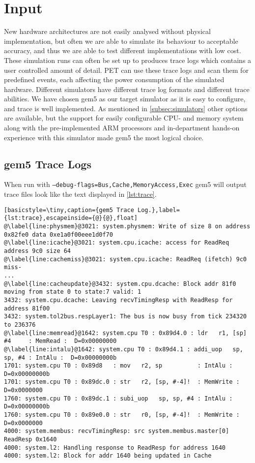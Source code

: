 \section{Input}
New hardware architectures are not easily analysed without physical
implementation, but often we are able to simulate its behaviour to acceptable
accuracy, and thus we are able to test different implementations with low cost.
These simulation runs can often be set up to produces trace logs which contains
a user controlled amount of detail. PET can use these trace logs and scan them
for predefined events, each affecting the power consumption of the simulated
hardware. Different simulators have different trace log formats and different
trace abilities. We have chosen gem5 as our target simulator as it is easy to
configure, and trace is well implemented. As mentioned in
\autoref{subsec:simulators} other options are available, but the support for
easily configurable CPU- and memory system along with the pre-implemented ARM
processors and in-department hands-on experience with this simulator made gem5
the most logical choice.

\subsection{gem5 Trace Logs}
When run with \texttt{--debug-flags=Bus,Cache,MemoryAccess,Exec} gem5 will output trace files look like
the text displayed in \autoref{lst:trace}.

\begin{lstlisting}[basicstyle=\tiny,caption={gem5 Trace Log.},label={lst:trace},escapeinside={@}{@},float]
@\label{line:physmem}@3021: system.physmem: Write of size 8 on address 0x82fe0 data 0xe1a0f00eee1d0f70
@\label{line:icache}@3021: system.cpu.icache: access for ReadReq address 9c0 size 64
@\label{line:cachemiss}@3021: system.cpu.icache: ReadReq (ifetch) 9c0 miss-
...
@\label{line:cacheupdate}@3432: system.cpu.dcache: Block addr 81f0 moving from state 0 to state:7 valid: 1
3432: system.cpu.dcache: Leaving recvTimingResp with ReadResp for address 81f00
3432: system.tol2bus.respLayer1: The bus is now busy from tick 234320 to 236376
@\label{line:memread}@1642: system.cpu T0 : 0x89d4.0 : ldr   r1, [sp] #4     : MemRead :  D=0x00000000
@\label{line:intalu}@1642: system.cpu T0 : 0x89d4.1 : addi_uop   sp, sp, #4 : IntAlu :  D=0x00000000b
1701: system.cpu T0 : 0x89d8   : mov   r2, sp          : IntAlu :  D=0x00000000b
1701: system.cpu T0 : 0x89dc.0 : str   r2, [sp, #-4]!  : MemWrite :  D=0x0000000
1760: system.cpu T0 : 0x89dc.1 : subi_uop   sp, sp, #4 : IntAlu :  D=0x00000000b
1760: system.cpu T0 : 0x89e0.0 : str   r0, [sp, #-4]!  : MemWrite :  D=0x0000000
4000: system.membus: recvTimingResp: src system.membus.master[0] ReadResp 0x1640
4000: system.l2: Handling response to ReadResp for address 1640
4000: system.l2: Block for addr 1640 being updated in Cache
\end{lstlisting}

